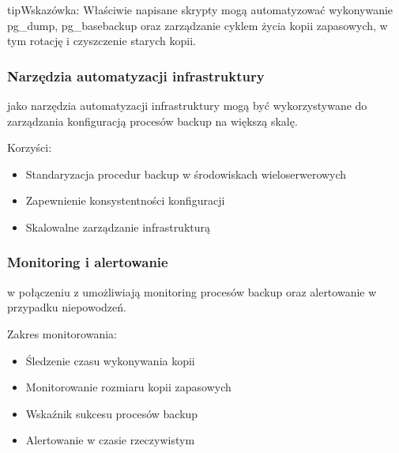 \documentclass[letterpaper,10pt,polish]{sphinxmanual}
\begin{document}
\begin{sphinxadmonition}{tip}{Wskazówka:}
\sphinxAtStartPar
Właściwie napisane skrypty mogą automatyzować wykonywanie pg\_dump, pg\_basebackup oraz zarządzanie cyklem życia kopii zapasowych, w tym rotację i czyszczenie starych kopii.
\end{sphinxadmonition}


\subsubsection{Narzędzia automatyzacji infrastruktury}
\label{\detokenize{rozdzial2/Kopie_zapasowe_i_odzyskiwanie_danych/kopie_zapasowe_i_odzyskiwanie_danych:narzedzia-automatyzacji-infrastruktury}}
\sphinxAtStartPar
{} jako narzędzia automatyzacji infrastruktury mogą być wykorzystywane do zarządzania konfiguracją procesów backup na większą skalę.

\sphinxAtStartPar
Korzyści:
\begin{itemize}
\item {} 
\sphinxAtStartPar
Standaryzacja procedur backup w środowiskach wieloserwerowych

\item {} 
\sphinxAtStartPar
Zapewnienie konsystentności konfiguracji

\item {} 
\sphinxAtStartPar
Skalowalne zarządzanie infrastrukturą

\end{itemize}


\subsubsection{Monitoring i alertowanie}
\label{\detokenize{rozdzial2/Kopie_zapasowe_i_odzyskiwanie_danych/kopie_zapasowe_i_odzyskiwanie_danych:monitoring-i-alertowanie}}
\sphinxAtStartPar
{} w połączeniu z  umożliwiają monitoring procesów backup oraz alertowanie w przypadku niepowodzeń.

\sphinxAtStartPar
Zakres monitorowania:
\begin{itemize}
\item {} 
\sphinxAtStartPar
Śledzenie czasu wykonywania kopii

\item {} 
\sphinxAtStartPar
Monitorowanie rozmiaru kopii zapasowych

\item {} 
\sphinxAtStartPar
Wskaźnik sukcesu procesów backup

\item {} 
\sphinxAtStartPar
Alertowanie w czasie rzeczywistym

\end{itemize}
\end{document}
